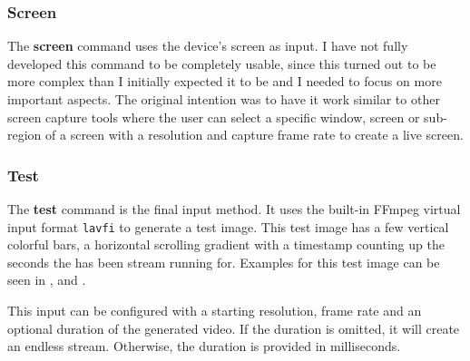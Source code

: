 \subsubsection{Screen}

The \textbf{screen} command uses the device's screen as input. I have not fully developed this command to be completely usable, since this turned out to be more complex than I initially expected it to be and I needed to focus on more important aspects. The original intention was to have it work similar to other screen capture tools where the user can select a specific window, screen or sub-region of a screen with a resolution and capture frame rate to create a live screen.

\subsubsection{Test}

The \textbf{test} command is the final input method. It uses the built-in FFmpeg virtual input format \texttt{lavfi} to generate a test image. This test image has a few vertical colorful bars, a horizontal scrolling gradient with a timestamp counting up the seconds the has been stream running for. Examples for this test image can be seen in ,  and .

This input can be configured with a starting resolution, frame rate and an optional duration of the generated video. If the duration is omitted, it will create an endless stream. Otherwise, the duration is provided in milliseconds.

